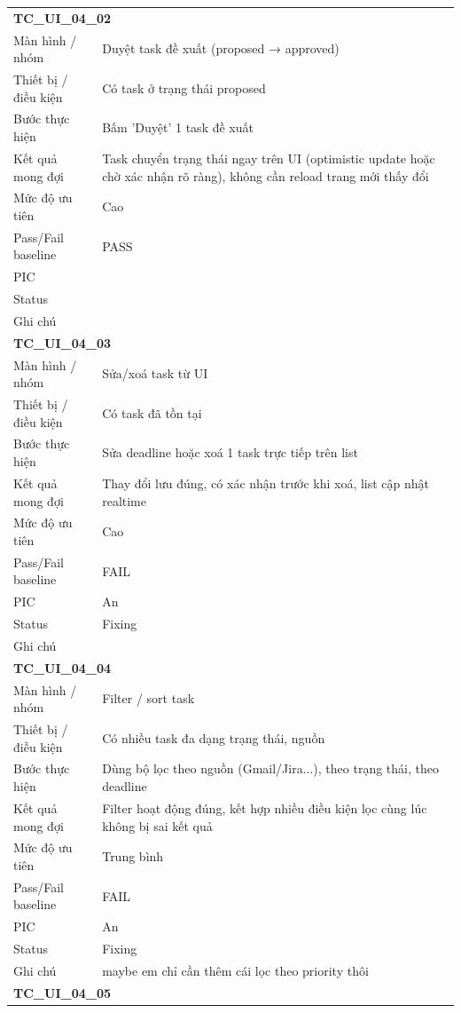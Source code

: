 \documentclass[12pt,a4paper]{article}
\begin{document}
\begin{longtable}{p{3.0cm}p{11.5cm}}
\midrule
\multicolumn{2}{l}{\textbf{TC\_UI\_04\_02}} \\
Màn hình / nhóm & Duyệt task đề xuất (proposed → approved) \\
Thiết bị / điều kiện & Có task ở trạng thái proposed \\
Bước thực hiện & Bấm 'Duyệt' 1 task đề xuất \\
Kết quả mong đợi & Task chuyển trạng thái ngay trên UI (optimistic update hoặc chờ xác nhận rõ ràng), không cần reload trang mới thấy đổi \\
Mức độ ưu tiên & Cao \\
Pass/Fail baseline & PASS \\
PIC &  \\
Status &  \\
Ghi chú &  \\
\midrule
\multicolumn{2}{l}{\textbf{TC\_UI\_04\_03}} \\
Màn hình / nhóm & Sửa/xoá task từ UI \\
Thiết bị / điều kiện & Có task đã tồn tại \\
Bước thực hiện & Sửa deadline hoặc xoá 1 task trực tiếp trên list \\
Kết quả mong đợi & Thay đổi lưu đúng, có xác nhận trước khi xoá, list cập nhật realtime \\
Mức độ ưu tiên & Cao \\
Pass/Fail baseline & FAIL \\
PIC & An \\
Status & Fixing \\
Ghi chú &  \\
\midrule
\multicolumn{2}{l}{\textbf{TC\_UI\_04\_04}} \\
Màn hình / nhóm & Filter / sort task \\
Thiết bị / điều kiện & Có nhiều task đa dạng trạng thái, nguồn \\
Bước thực hiện & Dùng bộ lọc theo nguồn (Gmail/Jira...), theo trạng thái, theo deadline \\
Kết quả mong đợi & Filter hoạt động đúng, kết hợp nhiều điều kiện lọc cùng lúc không bị sai kết quả \\
Mức độ ưu tiên & Trung bình \\
Pass/Fail baseline & FAIL \\
PIC & An \\
Status & Fixing \\
Ghi chú & maybe em chỉ cần thêm cái lọc theo priority thôi \\
\midrule
\multicolumn{2}{l}{\textbf{TC\_UI\_04\_05}} \\

\end{longtable}
\end{document}
